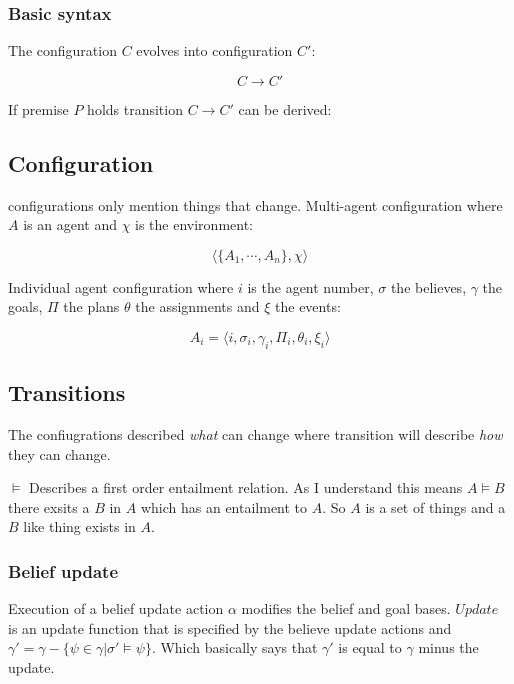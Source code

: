 \documentclass{article}
\begin{document}
\subsubsection{Basic syntax}
The configuration $C$ evolves into configuration $C'$:

\[C \to C'\]

If premise $P$ holds transition $C \to C'$ can be derived:

\begin{prooftree}
\end{prooftree}

\subsection{Configuration}
configurations only mention things that change.
Multi-agent configuration where $A$ is an agent and $\chi$ is the
environment:

\[\langle \{A_1, \cdots, A_n\}, \chi\rangle \]

Individual agent configuration where $i$ is the agent number, $\sigma$ the
believes, $\gamma$ the goals, $\Pi$ the plans $\theta$ the assignments and
$\xi$ the events:

\[A_i = \langle i, \sigma_i, \gamma_i, \Pi_i, \theta_i, \xi_i \rangle \]

\subsection{Transitions}
The confiugrations described \emph{what} can change where transition
will describe \emph{how} they can change.

$\vDash$ Describes a first order entailment relation. As I understand
this means $A \vDash B$ there exsits a $B$ in $A$ which has an entailment
to $A$. So $A$ is a set of things and a $B$ like thing exists in $A$.
\subsubsection{Belief update}
Execution of a belief update action $\alpha$ modifies the belief and goal
bases. $Update$ is an update function that is specified by the believe
update actions and $\gamma'=\gamma - \{\psi \in \gamma | \sigma' \vDash \psi\}$.
Which basically says that $\gamma'$ is equal to $\gamma$ minus the update.

\begin{prooftree}

\end{prooftree}
\end{document}
